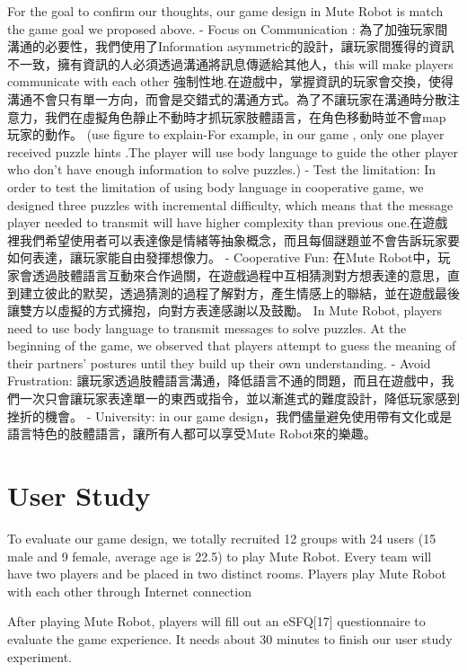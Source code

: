 \documentclass{sigchi}
\begin{document}
For the goal to confirm our thoughts, our game design in Mute Robot is match the game goal we proposed above.
- Focus on Communication : 為了加強玩家間溝通的必要性，我們使用了Information asymmetric的設計，讓玩家間獲得的資訊不一致，擁有資訊的人必須透過溝通將訊息傳遞給其他人，this will make players communicate with each other 強制性地.在遊戲中，掌握資訊的玩家會交換，使得溝通不會只有單一方向，而會是交錯式的溝通方式。為了不讓玩家在溝通時分散注意力，我們在虛擬角色靜止不動時才抓玩家肢體語言，在角色移動時並不會map 玩家的動作。
(use figure to explain-For example, in our game , only one player received puzzle hints .The player will use body language to guide the other player who don’t have enough information to solve puzzles.)
- Test the limitation: In order to test the limitation of using body language in cooperative game, we designed three puzzles with incremental difficulty, which means that the message player needed to transmit will have higher complexity than previous one.在遊戲裡我們希望使用者可以表達像是情緒等抽象概念，而且每個謎題並不會告訴玩家要如何表達，讓玩家能自由發揮想像力。
- Cooperative Fun: 在Mute Robot中，玩家會透過肢體語言互動來合作過關，在遊戲過程中互相猜測對方想表達的意思，直到建立彼此的默契，透過猜測的過程了解對方，產生情感上的聯結，並在遊戲最後讓雙方以虛擬的方式擁抱，向對方表達感謝以及鼓勵。
In Mute Robot, players need to use body language to transmit messages to solve puzzles. At the beginning of the game, we observed that players attempt to guess the meaning of their partners’ postures until they build up their own understanding. 
- Avoid Frustration: 讓玩家透過肢體語言溝通，降低語言不通的問題，而且在遊戲中，我們一次只會讓玩家表達單一的東西或指令，並以漸進式的難度設計，降低玩家感到挫折的機會。
- University: in our game design，我們儘量避免使用帶有文化或是語言特色的肢體語言，讓所有人都可以享受Mute Robot來的樂趣。

\section{User Study}
To evaluate our game design, we totally recruited 12 groups with 24 users (15 male and 9 female, average age is 22.5) to play Mute Robot.  Every team will have two players and be placed in two distinct rooms. Players play Mute Robot with each other through Internet connection

After playing Mute Robot, players will fill out an eSFQ[17] questionnaire to evaluate the game experience. It needs about 30 minutes to finish our user study experiment. 
\end{document}
